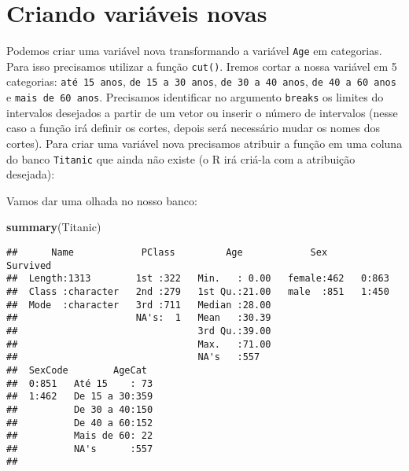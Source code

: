\documentclass[]{book}
\newenvironment{Shaded}{\begin{snugshade}}{\end{snugshade}}
\newcommand{\DataTypeTok}[1]{\textcolor[rgb]{0.13,0.29,0.53}{#1}}
\newcommand{\DecValTok}[1]{\textcolor[rgb]{0.00,0.00,0.81}{#1}}
\newcommand{\KeywordTok}[1]{\textcolor[rgb]{0.13,0.29,0.53}{\textbf{#1}}}
\newcommand{\NormalTok}[1]{#1}
\newcommand{\OperatorTok}[1]{\textcolor[rgb]{0.81,0.36,0.00}{\textbf{#1}}}
\newcommand{\OtherTok}[1]{\textcolor[rgb]{0.56,0.35,0.01}{#1}}
\newcommand{\StringTok}[1]{\textcolor[rgb]{0.31,0.60,0.02}{#1}}
\theoremstyle{definition}
\theoremstyle{definition}
\theoremstyle{definition}
\theoremstyle{remark}
\begin{document}
\hypertarget{criando-variuxe1veis-novas}{%
\section{Criando variáveis novas}\label{criando-variuxe1veis-novas}}

Podemos criar uma variável nova transformando a variável \texttt{Age} em categorias. Para isso precisamos utilizar a função \texttt{cut()}. Iremos cortar a nossa variável em 5 categorias: \texttt{até\ 15\ anos}, \texttt{de\ 15\ a\ 30\ anos}, \texttt{de\ 30\ a\ 40\ anos}, \texttt{de\ 40\ a\ 60\ anos} e \texttt{mais\ de\ 60\ anos}. Precisamos identificar no argumento \texttt{breaks} os limites do intervalos desejados a partir de um vetor ou inserir o número de intervalos (nesse caso a função irá definir os cortes, depois será necessário mudar os nomes dos cortes). Para criar uma variável nova precisamos atribuir a função em uma coluna do banco \texttt{Titanic} que ainda não existe (o R irá criá-la com a atribuição desejada):

\begin{Shaded}
\end{Shaded}

Vamos dar uma olhada no nosso banco:

\begin{Shaded}
\begin{Highlighting}[]
\KeywordTok{summary}\NormalTok{(Titanic)}
\end{Highlighting}
\end{Shaded}

\begin{verbatim}
##      Name            PClass         Age            Sex      Survived
##  Length:1313        1st :322   Min.   : 0.00   female:462   0:863   
##  Class :character   2nd :279   1st Qu.:21.00   male  :851   1:450   
##  Mode  :character   3rd :711   Median :28.00                        
##                     NA's:  1   Mean   :30.39                        
##                                3rd Qu.:39.00                        
##                                Max.   :71.00                        
##                                NA's   :557                          
##  SexCode        AgeCat   
##  0:851   Até 15    : 73  
##  1:462   De 15 a 30:359  
##          De 30 a 40:150  
##          De 40 a 60:152  
##          Mais de 60: 22  
##          NA's      :557  
## 
\end{verbatim}
\end{document}
